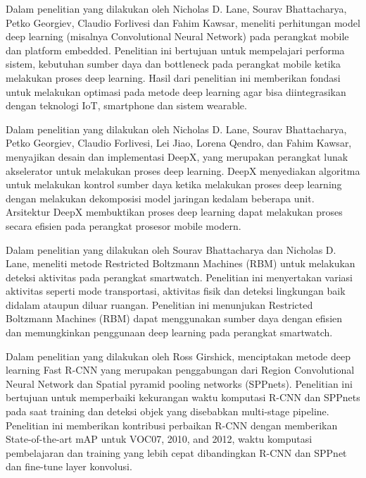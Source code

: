Dalam penelitian \cite{early_Resource} yang dilakukan oleh Nicholas D. Lane, Sourav Bhattacharya, Petko Georgiev, Claudio Forlivesi dan Fahim Kawsar, meneliti perhitungan model deep learning (misalnya Convolutional Neural Network) pada perangkat mobile dan platform embedded. Penelitian ini bertujuan untuk mempelajari performa sistem, kebutuhan sumber daya dan bottleneck pada perangkat mobile ketika melakukan proses deep learning. Hasil dari penelitian ini memberikan fondasi untuk melakukan optimasi pada metode deep learning agar bisa diintegrasikan dengan teknologi IoT, smartphone dan sistem wearable.

Dalam penelitian \cite{deepx} yang dilakukan oleh Nicholas D. Lane, Sourav Bhattacharya, Petko Georgiev, Claudio Forlivesi, Lei Jiao, Lorena Qendro, dan Fahim Kawsar, menyajikan desain dan implementasi DeepX, yang merupakan perangkat lunak akselerator untuk melakukan proses deep learning. DeepX menyediakan algoritma untuk melakukan kontrol sumber daya ketika melakukan proses deep learning dengan melakukan dekomposisi model jaringan kedalam beberapa unit. Arsitektur DeepX membuktikan proses deep learning dapat melakukan proses secara efisien pada perangkat prosesor mobile modern.

Dalam penelitian \cite{smart_to_deep} yang dilakukan oleh Sourav Bhattacharya dan Nicholas D. Lane, meneliti metode Restricted Boltzmann Machines (RBM) untuk melakukan deteksi aktivitas pada perangkat smartwatch. Penelitian ini menyertakan variasi aktivitas seperti mode transportasi, aktivitas fisik dan deteksi lingkungan baik didalam ataupun diluar ruangan. Penelitian ini menunjukan Restricted Boltzmann Machines (RBM) dapat menggunakan sumber daya dengan efisien dan memungkinkan penggunaan deep learning pada perangkat smartwatch.

Dalam penelitian \cite{fast_rcnn} yang dilakukan oleh Ross Girshick, menciptakan metode deep learning Fast R-CNN yang merupakan penggabungan dari Region Convolutional Neural Network dan Spatial pyramid pooling networks (SPPnets). Penelitian ini bertujuan untuk memperbaiki kekurangan waktu komputasi R-CNN dan SPPnets pada saat training dan deteksi objek yang disebabkan multi-stage pipeline. Penelitian ini memberikan kontribusi perbaikan R-CNN dengan memberikan State-of-the-art mAP untuk VOC07, 2010, and 2012, waktu komputasi pembelajaran dan training yang lebih cepat dibandingkan R-CNN dan SPPnet dan fine-tune layer konvolusi.

